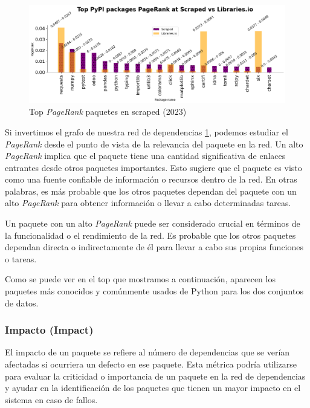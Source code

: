 \begin{figure}[h!]
    \begin{center}
        \includegraphics[width=1\textwidth]{img/pypi/t20_pkg_pr_scr.png}
        \caption{Top \textit{PageRank} paquetes en scraped (2023)}
        \label{fig:Top PageRank paquetes en scraped}
    \end{center}
\end{figure}

Si invertimos el grafo de nuestra red de dependencias \ref{fig:Top PageRank paquetes en scraped}, podemos estudiar el \textit{PageRank}
desde el punto de vista de la relevancia del paquete en la red. Un alto \textit{PageRank}
implica que el paquete tiene una cantidad significativa de enlaces entrantes desde otros paquetes
importantes. Esto sugiere que el paquete es visto como una fuente confiable de información o
recursos dentro de la red. En otras palabras, es más probable que los otros paquetes dependan
del paquete con un alto \textit{PageRank} para obtener información o llevar a cabo determinadas
tareas.

Un paquete con un alto \textit{PageRank} puede ser considerado crucial en términos de la funcionalidad
o el rendimiento de la red. Es probable que los otros paquetes dependan directa o indirectamente de
él para llevar a cabo sus propias funciones o tareas.

Como se puede ver en el top que mostramos a continuación, aparecen los paquetes más conocidos y
comúnmente usados de Python para los dos conjuntos de datos.

\subsubsection{Impacto (Impact)}

El impacto de un paquete se refiere al número de dependencias que se verían afectadas si
ocurriera un defecto en ese paquete. Esta métrica podría utilizarse para evaluar la criticidad
o importancia de un paquete en la red de dependencias y ayudar en la identificación de los
paquetes que tienen un mayor impacto en el sistema en caso de fallos.

